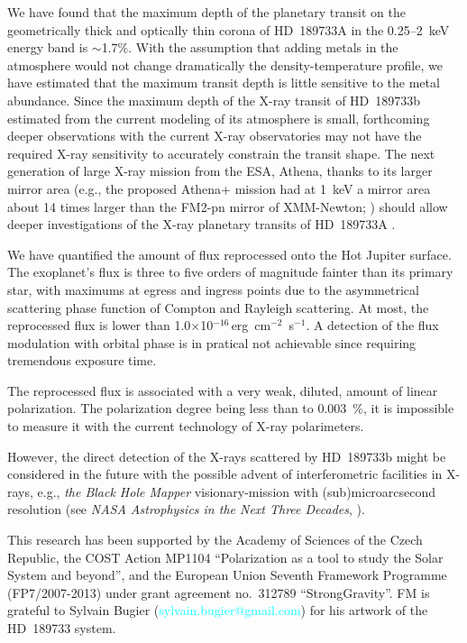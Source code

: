 \documentclass[iop]{emulateapj}
\begin{document}
We have found that the maximum depth of the planetary transit on the geometrically thick and optically thin corona of HD~189733A
in the 0.25--2~keV energy band is $\sim$1.7\%. With the assumption that adding metals in the atmosphere would not change dramatically 
the density-temperature profile, we have estimated that the maximum transit depth is little sensitive to the metal abundance. Since 
the maximum depth of the X-ray transit of HD~189733b estimated from the current modeling of its atmosphere is small, forthcoming deeper
observations with the current X-ray observatories may not have the required X-ray sensitivity to accurately constrain the transit shape. 
The next generation of large X-ray mission from the ESA, Athena, thanks to its larger mirror area (e.g., the proposed Athena+ mission had 
at 1~keV a mirror area about 14 times larger than the FM2-pn mirror of XMM-Newton; \citealt{Nandra2013,Jansen2001}) should allow deeper 
investigations of the X-ray planetary transits of HD~189733A \citep{Branduardi2013}.

We have quantified the amount of flux reprocessed onto the Hot Jupiter surface. The exoplanet's flux is three to five orders of 
magnitude fainter than its primary star, with maximums at egress and ingress points due to the asymmetrical scattering phase function 
of Compton and Rayleigh scattering. At most, the reprocessed flux is lower than 1.0$\times$10$^{-16~}$erg~cm$^{-2}$~s$^{-1}$. 
A detection of the flux modulation with orbital phase is in pratical not achievable since requiring tremendous exposure time.

The reprocessed flux is associated with a very weak, diluted, amount of linear polarization. The polarization degree being less than 
to 0.003~\%, it is impossible to measure it with the current technology of X-ray polarimeters. 

However, the direct detection of the X-rays scattered by HD~189733b might be considered in the future with the possible advent of 
interferometric facilities in X-rays, e.g., \emph{the Black Hole Mapper} visionary-mission with (sub)microarcsecond resolution (see 
\emph{NASA Astrophysics in the Next Three Decades}, \citealt{Kouveliotou2014}).


\acknowledgements
This research has been supported by the Academy of Sciences of the Czech Republic, the COST Action MP1104 ``Polarization as a tool 
to study the Solar System and beyond'', and the European Union Seventh Framework Programme (FP7/2007-2013) under grant agreement 
no.\ 312789 ``StrongGravity''. FM is grateful to Sylvain Bugier (\textcolor{cyan}{sylvain.bugier@gmail.com}) for his artwork 
of the HD~189733 system. 
\end{document}
